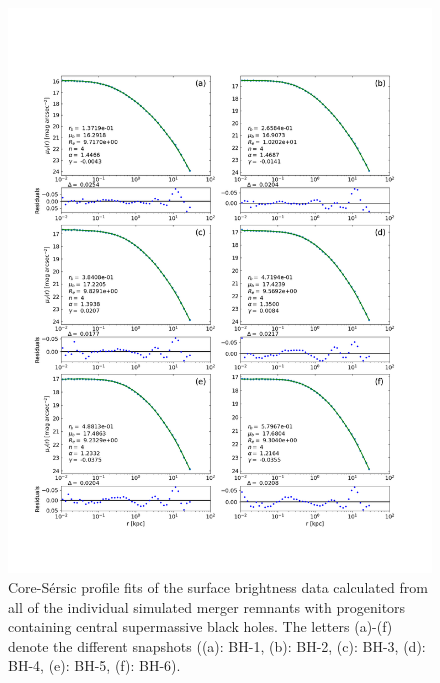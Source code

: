 \documentclass[english, oneside]{HYgradu}
\begin{document}
\begin{figure}[h]
	\centering
	\includegraphics[width=\textwidth]{all_core_profiles.png}
	\caption{Core-Sérsic profile fits of the surface brightness data calculated from all of the individual simulated merger remnants with progenitors containing central supermassive black holes. The letters (a)-(f) denote the different snapshots ((a): BH-1, (b): BH-2, (c): BH-3, (d): BH-4, (e): BH-5, (f): BH-6).}
	\label{figure:all_core}
\end{figure}
\end{document}
